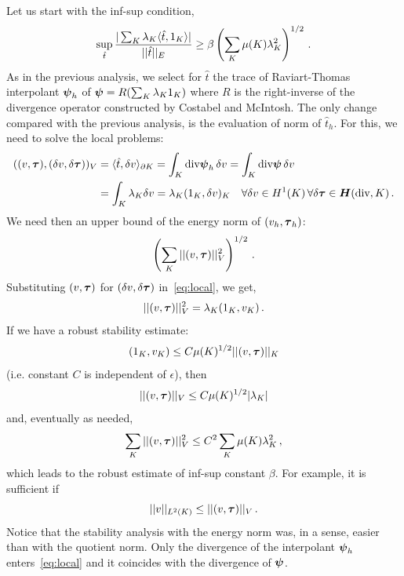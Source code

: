 \documentclass[Proposal.tex]{subfiles}
\begin{document}
Let us start with the inf-sup condition,
\begin{equation}
\sup_{\hat{t}} \frac{| \sum_K \lambda_K \langle \hat{t},1_K \rangle |}{|| \hat{t} ||_E}
\geq  \beta \left( \sum_K \mu(K) \lambda_K^2 \right)^{1/2}\,.
\end{equation}
As in the previous analysis, we select for $\hat{t}$ the trace of Raviart-Thomas
interpolant $\boldsymbol\psi_h$ of $\boldsymbol\psi = R (\sum_K \lambda_K 1_K)$ where $R$ is the right-inverse
of the divergence operator constructed by Costabel and McIntosh. The only change compared
with the previous analysis, is the evaluation of norm of $\hat{t}_h$. For this, we need
to solve the local problems:
\begin{align}
((v,\boldsymbol\tau), (\delta v, \delta \boldsymbol\tau))_V &= \langle \hat{t}, \delta v \rangle_{\partial K}
= \int_K \text{div} \boldsymbol\psi_h \, \delta v = \int_K \text{div} \boldsymbol\psi \, \delta v
\nonumber\\
&= \int_K \lambda_K \delta v
= \lambda_K (1_K,\delta v)_K  \quad \forall \delta v \in
H^1(K)\,\forall\delta\boldsymbol\tau\in\mbox{\boldmath $H$}(\text{div},K)\,.
\label{eq:local}
\end{align}
We need then an upper bound of the energy norm of $(v_h,\boldsymbol\tau_h)$:
$$
\left( \sum_K || (v,\boldsymbol\tau) ||_V^2 \right)^{1/2}\,.
$$
Substituting $(v,\boldsymbol\tau)$ for $(\delta v,\delta\boldsymbol\tau)$ in~\eqref{eq:local}, we get,
\begin{equation}
|| (v,\boldsymbol\tau) ||_V^2 = \lambda_K (1_K, v_K)\,.
\end{equation}
If we have a robust stability estimate:
\begin{equation}
(1_K, v_K) \leq C \mu(K)^{1/2} || (v,\boldsymbol\tau) ||_K
\label{eq:robustEst1}
\end{equation}
(i.e. constant $C$ is independent of $\epsilon$), then
\begin{equation}
||  (v,\boldsymbol\tau) ||_V \leq C \mu(K)^{1/2} | \lambda_K |
\end{equation}
and, eventually as needed,
\begin{equation}
\sum_K || (v,\boldsymbol\tau) ||_V^2  \leq C^2 \sum_K \mu(K) \lambda_K^2\,,
\end{equation}
which leads to the robust estimate of inf-sup constant $\beta$. For example, it is sufficient if
\begin{equation}
|| v ||_{L^2(K)} \leq || (v,\boldsymbol\tau) ||_V \, .
\label{eq:robust_est1}
\end{equation}
Notice that the stability analysis with the energy norm was, in a sense, easier than
with the quotient norm. Only the divergence of the interpolant $\boldsymbol\psi_h$
enters~\eqref{eq:local}
and it coincides with the divergence of $\boldsymbol\psi$.
\end{document}
